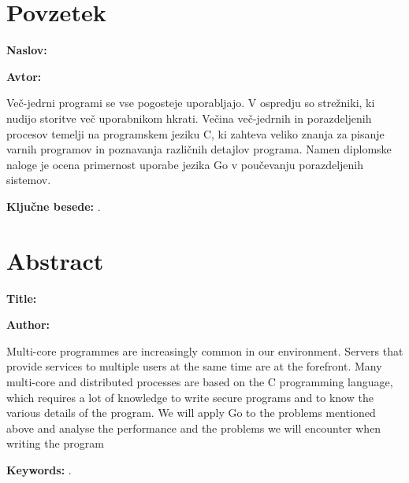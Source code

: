 \chapter*{Povzetek}

\noindent\textbf{Naslov:} \ttitle
\bigskip

\noindent\textbf{Avtor:} \tauthor
\bigskip

\noindent Več-jedrni programi se vse pogosteje uporabljajo. V ospredju so strežniki, ki nudijo storitve več uporabnikom hkrati. Večina več-jedrnih in porazdeljenih procesov temelji na programskem jeziku C, ki zahteva veliko znanja  za pisanje varnih programov in poznavanja različnih detajlov programa. Namen diplomske naloge je ocena primernost uporabe jezika Go v poučevanju porazdeljenih sistemov. 

\bigskip

\noindent\textbf{Ključne besede:} \tkeywords.
\clearemptydoublepage

\chapter*{Abstract}

\noindent\textbf{Title:} \ttitleEn
\bigskip

\noindent\textbf{Author:} \tauthor
\bigskip

\noindent Multi-core programmes are increasingly common in our environment. Servers that provide services to multiple users at the same time are at the forefront. Many multi-core and distributed processes are based on the C programming language, which requires a lot of knowledge to write secure programs and to know the various details of the program. We will apply Go to the problems mentioned above and analyse the performance and the problems we will encounter when writing the program 

\bigskip

\noindent\textbf{Keywords:} \tkeywordsEn.
\clearemptydoublepage